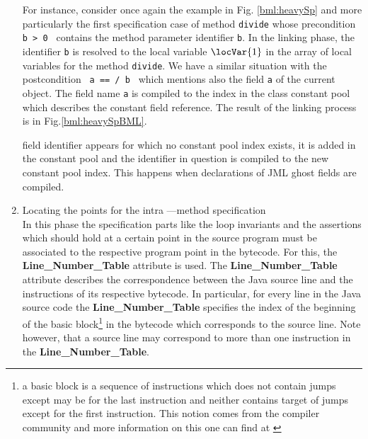 \documentclass[a4paper]{llncs}
\begin{document}
\begin{enumerate}
      For instance, consider once again the example in
      Fig. \ref{bml:heavySp} and more particularly the first
      specification case of method \texttt{divide} whose precondition
      \texttt{ b > 0 } contains the method parameter identifier
      \texttt{b}.  In the linking phase, the identifier \texttt{b} is
      resolved to the local variable $\locVar{1}$ in the array of
      local variables for the method \texttt{divide}.  We have a
      similar situation with the postcondition \texttt{ a ==  /
      b } which mentions also the field \texttt{a} of the current
      object.  The field name \texttt{a} is compiled to the index in
      the class constant pool which describes the constant field
      reference.  The result of the linking process is in
      Fig.\ref{bml:heavySpBML}.

      field identifier appears for which no constant pool index
      exists, it is added in the constant pool and the identifier in
      question is compiled to the new constant pool index. This
      happens when declarations of JML ghost fields are compiled.
     

  





      

\item Locating the points for the intra ---method specification \\

      In this phase the specification parts like the loop invariants
      and the assertions which should hold at a certain point in the
      source program must be associated to the respective program
      point in the bytecode. For this, the
      \textbf{Line\_Number\_Table} attribute is used. The
      \textbf{Line\_Number\_Table} attribute describes the
      correspondence between the Java source line and the instructions
      of its respective bytecode.  In particular, for every line in
      the Java source code the \textbf{Line\_Number\_Table} specifies
      the index of the beginning of the basic block\footnote{a basic
      block is a sequence of instructions which does not contain jumps
      except may be for the last instruction and neither contains
      target of jumps except for the first instruction. This notion
      comes from the compiler community and more information on this
      one can find at \cite{ARUCom1986}} in the bytecode which
      corresponds to the source line. Note however, that a source line
      may correspond to more than one instruction in the
      \textbf{Line\_Number\_Table}.
     

\end{enumerate}
\end{document}

